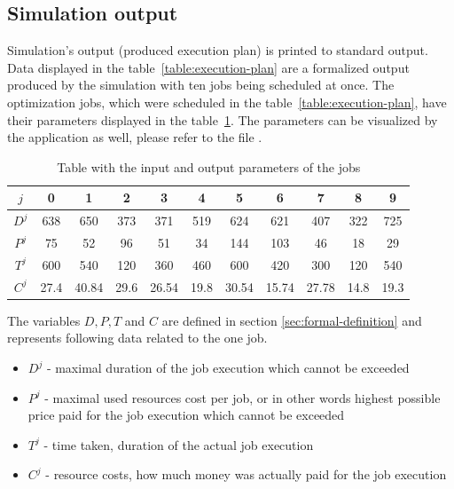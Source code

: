 \subsection{Simulation output}\label{subsec:simulation-output}

Simulation's output (produced execution plan) is printed to standard output.
Data displayed in the table~\ref{table:execution-plan} are a formalized output produced by the simulation with ten jobs being scheduled at once.
The optimization jobs,
which were scheduled in the table~\ref{table:execution-plan},
have their parameters displayed in the table~\ref{table:jobs-parameters}. 
The parameters can be visualized by the application as well, 
please refer to the file .

\begin{table}[ht]
	\centering
	\caption{Table with the input and output parameters of the jobs}
	\begin{tabular}{|c|c c c c c c c c c c|} 
		\hline
		$j$       & 0   & 1     & 2   & 3     & 4     & 5     & 6     & 7     & 8     & 9 \\
		\hline\hline
		$D^{j}$   & 638 & 650   & 373 & 371   & 519   & 624   & 621   & 407   & 322   & 725 \\
		\hline
		$P^{j}$   & 75  & 52    & 96  & 51    & 34    & 144   & 103   & 46    & 18    & 29 \\
		\hline\hline
		$T^{j}$   & 600 & 540   & 120 & 360   & 460   & 600   & 420   & 300   & 120   & 540  \\
		\hline
		$C^{j}$   & 27.4& 40.84 & 29.6& 26.54 & 19.8  & 30.54 & 15.74 & 27.78 & 14.8  & 19.3 \\
		\hline
	\end{tabular}
	\label{table:jobs-parameters}
\end{table}

The variables $D,P,T$ and $C$ are defined in section \ref{sec:formal-definition}
and represents following data related to the one job.
\begin{itemize}
	\item $D^{j}$ - maximal duration of the job execution which cannot be exceeded
	\item $P^{j}$ - maximal used resources cost per job,
	      or in other words highest possible price paid for the job execution which cannot be exceeded
	\item $T^{j}$ - time taken, duration of the actual job execution
	\item $C^{j}$ - resource costs, how much money was actually paid for the job execution
\end{itemize}


